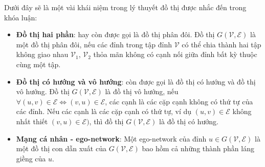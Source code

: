 Dưới đây sẽ là một vài khái niệm trong lý thuyết đồ thị được nhắc đến trong khóa luận:
\begin{itemize} 
	\item \textbf{Đồ thị hai phần}: hay còn được gọi là đồ thị phân đôi. Đồ thị $G(\mathcal{V},\mathcal{E})$ là một đồ thị phân đôi, nếu các đỉnh trong tập đỉnh $\mathcal{V}$ có thể chia thành hai tập không giao nhau $\mathcal{V}_1$, $\mathcal{V}_2$ thỏa mãn không có cạnh nối giữa đỉnh bất kỳ thuộc cùng một tập.
	\item \textbf{Đồ thị có hướng và vô hướng}: còn được gọi là đồ thị có hướng và đồ thị vô hướng. Đồ thị $G(\mathcal{V},\mathcal{E})$ là đồ thị vô hướng, nếu $\forall(u,v) \in \mathcal{E} \Leftrightarrow (v,u) \in \mathcal{E}$, các cạnh là các cặp cạnh không có thứ tự của các đỉnh. Nếu các cạnh là các cặp cạnh có thứ tự, ví dụ $(u,v) \in \mathcal{E}$ không nhất thiết $(v,u) \in \mathcal{E})$, thì đồ thị $G(\mathcal{V},\mathcal{E})$ là đồ thị có hướng.
	\item \textbf{Mạng cá nhân - ego-network}: Một ego-network của đỉnh $u \in G(\mathcal{V},\mathcal{E})$ là một đồ thị con dẫn xuất của $G(\mathcal{V},\mathcal{E})$ bao hồm cả những thành phần láng giềng của $u$.
\end{itemize}
